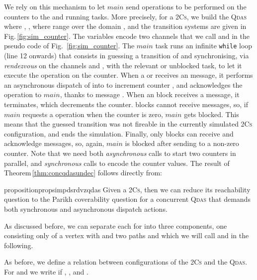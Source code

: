 \documentclass[runningheads,oribibl,]{article}
\newcommand{\main}{\ensuremath{\textit{main}}\xspace}
\newcommand{\qdas}{\textsc{Qdas}\xspace}
\newcommand{\twocs}{2\textsc{Cs}\xspace}
\begin{document}
We rely on this mechanism to let \main send operations to be performed
on the counters to the  and  running tasks. More
precisely, for a \twocs , we
build the \qdas  where ,
,
 where 
range over the domain , and the
transition systems are given in Fig.\,\ref{fig:sim_counter}. The
variables  encode two channels that we call  and  in the
pseudo code of Fig.~\ref{fig:sim_counter}. The \main task runs an
infinite \texttt{while} loop (line 12 onwards) that consists in
guessing a transition  of  and synchronising, via
\emph{rendezvous} on the channels  and , with the relevant
 or  unblocked task, to let it execute the operation on
the counter. When a  or  receives an 
message, it performs an asynchronous dispatch of  into  to
increment counter , and acknowledges the operation to \main, thanks
to message . When an  block receives a  message, it
terminates, which decrements the counter.  blocks cannot receive
 messages, so, if \main requests a  operation when the
counter is zero, \main gets blocked. This means that the guessed
transition was not fireable in the currently simulated \twocs configuration, and ends the
simulation. Finally, only  blocks can receive and acknowledge
 messages, so, again, \main is blocked after sending
 to a non-zero counter.
Note that we need both \emph{asynchronous} calls to start two counters
in parallel, and \emph{synchronous} calls to encode the counter
values. The result of Theorem\,\ref{thm:concqdasundec} follows
directly from:

\begin{restatable}{proposition}{propsimpdsrdvzqdas}
  \label{prop:sim_pds_rdvz_qdas}
  Given a \twocs,
  then we can reduce its reachability question
  to the Parikh coverability question for a concurrent \qdas that demands
  both synchronous and asynchronous dispatch actions.
\end{restatable}


As discussed before, we can separate each  for
 into three components, one
consisting only of a vertex  with 
and two paths  and  which
we will call  and  in the following.

As before, we define a relation between configurations of the \twocs  and
the \qdas . For  and
 we
write  if , ,
and .
\end{document}
